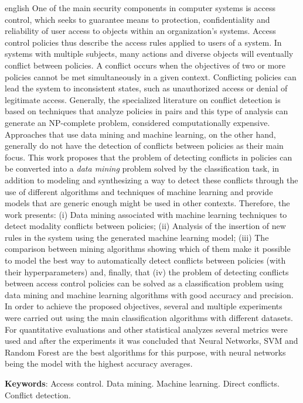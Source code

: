 \documentclass[
	12pt,				%
	openright,			%
	oneside,			%
	a4paper,			%
	english,			%
	french,				%
	spanish,			%
	brazil				%
	]{abntex2}
\begin{document}
\begin{resumo}[Abstract]
\begin{otherlanguage*}{english}
One of the main security components in computer systems is access control, which seeks to guarantee means to protection, confidentiality and reliability of user access to objects within an organization's systems. Access control policies thus describe the access rules applied to users of a system. In systems with multiple subjects, many actions and diverse objects will eventually conflict between policies. A conflict occurs when the objectives of two or more policies cannot be met simultaneously in a given context. Conflicting policies can lead the system to inconsistent states, such as unauthorized access or denial of legitimate access. Generally, the specialized literature on conflict detection is based on techniques that analyze policies in pairs and this type of analysis can generate an NP-complete problem, considered computationally expensive. Approaches that use data mining and machine learning, on the other hand, generally do not have the detection of conflicts between policies as their main focus. This work proposes that the problem of detecting conflicts in policies can be converted into a \textit{data mining} problem solved by the classification task, in addition to modeling and synthesizing a way to detect these conflicts through the use of different algorithms and techniques of machine learning and provide models that are generic enough might be used in other contexts. Therefore, the work presents: (i) Data mining associated with machine learning techniques to detect modality conflicts between policies; (ii) Analysis of the insertion of new rules in the system using the generated machine learning model; (iii) The comparison between mining algorithms showing which of them make it possible to model the best way to automatically detect conflicts between policies (with their hyperparameters) and, finally, that (iv) the problem of detecting conflicts between access control policies can be solved as a classification problem using data mining and machine learning algorithms with good accuracy and precision. In order to achieve the proposed objectives, several and multiple experiments were carried out using the main classification algorithms with different datasets. For quantitative evaluations and other statistical analyzes several metrics were used and after the experiments it was concluded that Neural Networks, SVM and Random Forest are the best algorithms for this purpose, with neural networks being the model with the highest accuracy averages.
   \vspace{\onelineskip}
 
   \noindent 
   \textbf{Keywords}: Access control. Data mining. Machine learning. Direct conflicts. Conflict detection.
 \end{otherlanguage*}
\end{resumo}
\end{document}
